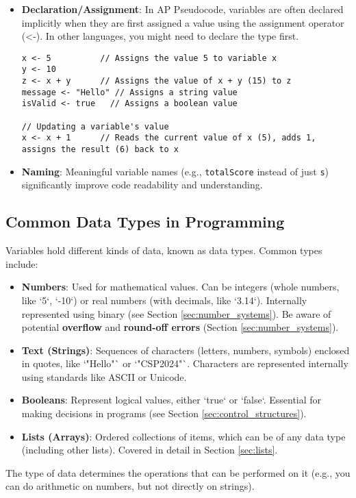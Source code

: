 \documentclass[11pt,oneside]{book}
\begin{document}
\begin{itemize}
\item \textbf{Declaration/Assignment}: In AP Pseudocode, variables are often declared implicitly when they are first assigned a value using the assignment operator (<-). In other languages, you might need to declare the type first.
\begin{lstlisting}[language={}, label={lst:assignment_detail}, caption={AP Pseudocode: Assignment Examples}]
x <- 5          // Assigns the value 5 to variable x
y <- 10
z <- x + y      // Assigns the value of x + y (15) to z
message <- "Hello" // Assigns a string value
isValid <- true   // Assigns a boolean value

// Updating a variable's value
x <- x + 1      // Reads the current value of x (5), adds 1, assigns the result (6) back to x
\end{lstlisting}
\item \textbf{Naming}: Meaningful variable names (e.g., \texttt{totalScore} instead of just \texttt{s}) significantly improve code readability and understanding.
\end{itemize}

\subsection*{Common Data Types in Programming}
Variables hold different kinds of data, known as data types. Common types include:
\begin{itemize}
    \item \textbf{Numbers}: Used for mathematical values. Can be integers (whole numbers, like `5`, `-10`) or real numbers (with decimals, like `3.14`). Internally represented using binary (see Section \ref{sec:number_systems}). Be aware of potential \textbf{overflow} and \textbf{round-off errors} (Section \ref{sec:number_systems}).
    \item \textbf{Text (Strings)}: Sequences of characters (letters, numbers, symbols) enclosed in quotes, like `"Hello"` or `"CSP2024"`. Characters are represented internally using standards like ASCII or Unicode.
    \item \textbf{Booleans}: Represent logical values, either `true` or `false`. Essential for making decisions in programs (see Section \ref{sec:control_structures}).
    \item \textbf{Lists (Arrays)}: Ordered collections of items, which can be of any data type (including other lists). Covered in detail in Section \ref{sec:lists}.
\end{itemize}
The type of data determines the operations that can be performed on it (e.g., you can do arithmetic on numbers, but not directly on strings).
\end{document}
